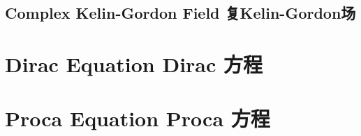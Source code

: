 \subsection[复Kelin-Gordon场]{Complex Kelin-Gordon Field 复Kelin-Gordon场}\label{sec6.2.1}

\section[Dirac方程]{Dirac Equation Dirac 方程}\label{sec6.3}


\section[Proca方程]{Proca Equation Proca 方程}\label{sec6.4}







